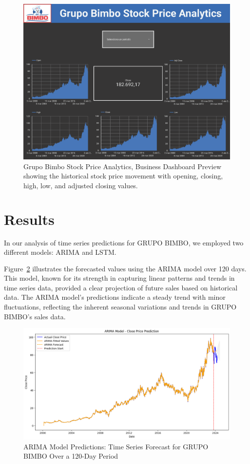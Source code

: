 \documentclass[conference]{IEEEtran}
\begin{document}
\begin{figure}[htbp]
    \centering
    \includegraphics[scale=0.25]{Bimbo_Stock_Market_Dashboard_Preview.png} 
    \caption{Grupo Bimbo Stock Price Analytics, Business Dashboard Preview showing the historical stock price movement with opening, closing, high, low, and adjusted closing values.}
    \label{fig:bimbostockprice}
\end{figure}




\section{Results}

In our analysis of time series predictions for GRUPO BIMBO, we employed two different models: ARIMA and LSTM. 

Figure~\ref{fig:bimboarima} illustrates the forecasted values using the ARIMA model over 120 days. This model, known for its strength in capturing linear patterns and trends in time series data, provided a clear projection of future sales based on historical data. The ARIMA model's predictions indicate a steady trend with minor fluctuations, reflecting the inherent seasonal variations and trends in GRUPO BIMBO's sales data.

\begin{figure}[htb]
    \centering
    \includegraphics[scale = 0.3]{ARIMA.png}
    \caption{ARIMA Model Predictions: Time Series Forecast for GRUPO BIMBO Over a 120-Day Period}
    \label{fig:bimboarima}
\end{figure}
\end{document}
